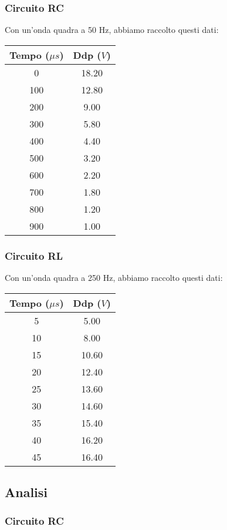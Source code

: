\subsubsection{Circuito RC}
Con un'onda quadra a 50 Hz, abbiamo raccolto questi dati:
\begin{center}
\begin{tabular}{*{2}{c}}
Tempo ($\mu s$) & Ddp ($V$) \\
\midrule
0 & 18.20 \\
100 & 12.80 \\
200 & 9.00 \\
300 & 5.80 \\
400 & 4.40 \\
500 & 3.20 \\
600 & 2.20 \\
700 & 1.80 \\
800 & 1.20 \\
900 & 1.00 \\
\end{tabular}
\end{center}


\subsubsection{Circuito RL}
Con un'onda quadra a 250 Hz, abbiamo raccolto questi dati:

\begin{center}
\begin{tabular}{*{2}{c}}
Tempo ($\mu s$) & Ddp ($V$) \\
\midrule
5 & 5.00 \\
10 & 8.00 \\
15 & 10.60 \\
20 & 12.40 \\
25 & 13.60 \\
30 & 14.60 \\
35 & 15.40 \\
40 & 16.20 \\
45 & 16.40 \\
\end{tabular}
\end{center}

\subsection{Analisi}

\subsubsection{Circuito RC}


